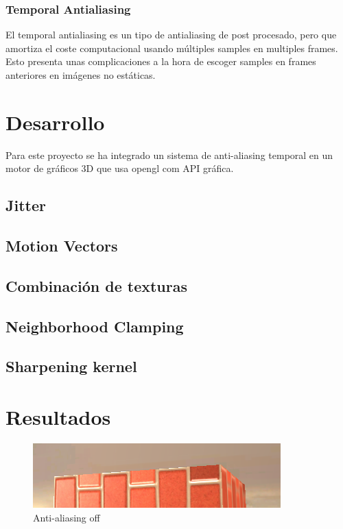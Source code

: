 \documentclass[withindex, glossary]{cam-thesis}
\begin{document}
\subsection{Temporal Antialiasing}

El temporal antialiasing es un tipo de antialiasing de post procesado, pero que amortiza el coste computacional usando múltiples samples en multiples frames. Esto presenta unas complicaciones a la hora de escoger samples en frames anteriores en imágenes no estáticas.

\chapter{Desarrollo}

Para este proyecto se ha integrado un sistema de anti-aliasing temporal en un motor de gráficos 3D que usa \Gls{opengl} com API gráfica.

\section{Jitter}

\section{Motion Vectors}

\section{Combinación de texturas}

\section{Neighborhood Clamping}

\section{Sharpening kernel}

\chapter{Resultados}

\begin{figure}
    \includegraphics[width=\linewidth]{figures/taaoff.png}
    \caption{Anti-aliasing off}
\end{figure}
\end{document}
